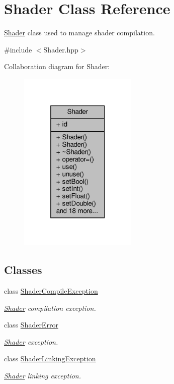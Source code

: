 \hypertarget{class_shader}{}\section{Shader Class Reference}
\label{class_shader}


\hyperlink{class_shader}{Shader} class used to manage shader compilation.  




{\ttfamily \#include $<$Shader.\+hpp$>$}



Collaboration diagram for Shader\+:
\nopagebreak
\begin{figure}[H]
\begin{center}
\leavevmode
\includegraphics[width=160pt]{class_shader__coll__graph}
\end{center}
\end{figure}
\subsection*{Classes}
\begin{DoxyCompactItemize}
\item 
class \hyperlink{class_shader_1_1_shader_compile_exception}{Shader\+Compile\+Exception}
\begin{DoxyCompactList}\small\item\em \hyperlink{class_shader}{Shader} compilation exception. \end{DoxyCompactList}\item 
class \hyperlink{class_shader_1_1_shader_error}{Shader\+Error}
\begin{DoxyCompactList}\small\item\em \hyperlink{class_shader}{Shader} exception. \end{DoxyCompactList}\item 
class \hyperlink{class_shader_1_1_shader_linking_exception}{Shader\+Linking\+Exception}
\begin{DoxyCompactList}\small\item\em \hyperlink{class_shader}{Shader} linking exception. \end{DoxyCompactList}\end{DoxyCompactItemize}

